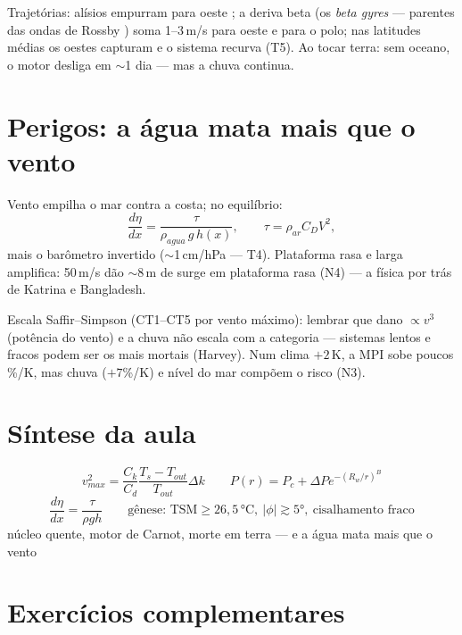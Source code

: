\documentclass[11pt]{article}
\begin{document}
Trajetórias: alísios empurram para oeste ; a
deriva beta (os \emph{beta gyres} — parentes das ondas de Rossby
) soma 1--3\,m/s para oeste e para o polo; nas
latitudes médias os oestes capturam e o sistema recurva (T5). Ao
tocar terra: sem oceano, o motor desliga em $\sim$1 dia — mas a chuva
continua.

\section{Perigos: a água mata mais que o vento}\label{sec:perigos}


\begin{formadif}
Vento empilha o mar contra a costa; no equilíbrio:
\[ \frac{d\eta}{dx} = \frac{\tau}{\rho_{agua}\,g\,h(x)},\qquad
\tau = \rho_{ar}C_D V^2, \]
mais o barômetro invertido ($\sim$1\,cm/hPa — T4). Plataforma rasa e
larga amplifica: 50\,m/s dão $\sim$8\,m de surge em plataforma rasa
(N4) — a física por trás de Katrina e Bangladesh.
\end{formadif}

Escala Saffir--Simpson (CT1--CT5 por vento máximo): lembrar que dano
$\propto v^3$ (potência do vento) e a chuva não escala com a
categoria — sistemas lentos e fracos podem ser os mais mortais
(Harvey). Num clima $+2$\,K, a MPI sobe poucos \%/K, mas chuva
($+7$\%/K) e nível do mar compõem o risco  (N3).

\section{Síntese da aula}

\begin{noquadro}
\[ v_{max}^2 = \frac{C_k}{C_d}\frac{T_s - T_{out}}{T_{out}}\Delta k
\qquad P(r) = P_c + \Delta P e^{-(R_w/r)^B} \]
\[ \frac{d\eta}{dx} = \frac{\tau}{\rho g h} \qquad
\text{gênese: TSM} \ge 26{,}5\,°\mathrm{C},\ |\phi| \gtrsim 5°,\
\text{cisalhamento fraco} \]
núcleo quente, motor de Carnot, morte em terra — e a água mata mais
que o vento
\end{noquadro}

\section{Exercícios complementares}\label{sec:exercicios}
\end{document}
